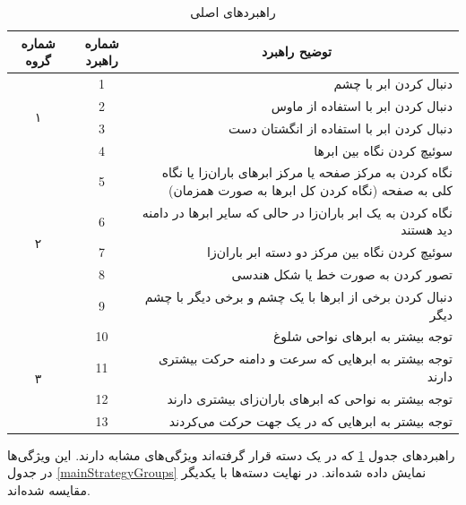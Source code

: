 \documentclass[twoside, a4paper,11pt]{book}
\numberwithin{equation}{chapter}
\numberwithin{table}{chapter}
\numberwithin{figure}{chapter}
\numberwithin{equation}{chapter}
\begin{document}
\begin{table}[]
	\centering
	\caption{راهبرد‌های اصلی}
	\label{StrategyList}
	\begin{scriptsize}
	\begin{center}
	\renewcommand{\arraystretch}{2}
	\begin{tabular}{|c|c|r|}
		\hline
\textbf{شماره گروه} & \textbf{شماره راهبرد} & \multicolumn{1}{c|}{\textbf{توضیح راهبرد}} \\ \hline
		\multirow{4}{*}{۱} & 1 & دنبال کردن ابر با چشم \\ \cline{2-3} 
		& 2 & دنبال کردن ابر با استفاده از ماوس \\ \cline{2-3} 
		& 3 & دنبال کردن ابر با استفاده از انگشتان دست \\ \cline{2-3} 
		& 4 & سوئیچ کردن نگاه بین ابرها \\ \hline
		\multirow{5}{*}{۲} & 5 & نگاه کردن به مرکز صفحه یا مرکز ابرهای باران‌زا یا نگاه کلی به صفحه (نگاه کردن کل ابرها به صورت همزمان) \\ \cline{2-3} 
		& 6 & نگاه کردن به یک ابر باران‌زا در حالی که سایر ابرها در دامنه دید هستند \\ \cline{2-3} 
		& 7 & سوئیچ کردن نگاه بین مرکز دو دسته ابر باران‌زا \\ \cline{2-3} 
		& 8 & تصور کردن به صورت خط یا شکل هندسی \\ \cline{2-3} 
		& 9 & دنبال کردن برخی از ابرها با یک چشم و برخی دیگر با چشم دیگر \\ \hline
		\multirow{4}{*}{۳} & 10 & توجه بیشتر به ابرهای نواحی شلوغ \\ \cline{2-3} 
		& 11 & توجه بیشتر به ابرهایی که سرعت و دامنه حرکت بیشتری دارند \\ \cline{2-3} 
		& 12 & توجه بیشتر به نواحی که ابرهای باران‌زای بیشتری دارند \\ \cline{2-3} 
		& 13 & توجه بیشتر به ابرهایی که در یک جهت حرکت می‌کردند \\ \hline
	\end{tabular}
	\end{center}
	\end{scriptsize}
\end{table}

راهبرد‌های جدول \ref{StrategyList} که در یک دسته قرار گرفته‌اند ویژگی‌های مشابه دارند. این ویژگی‌ها در جدول \ref{mainStrategyGroups} نمایش داده شده‌اند. در نهایت دسته‌ها با یکدیگر مقایسه شده‌اند.
\end{document}
